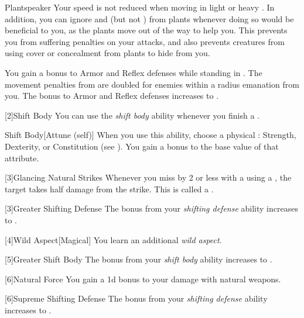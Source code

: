 {            \begin{freeability}{Plantspeaker}
                Your speed is not reduced when moving in light or heavy .
                In addition, you can ignore  and  (but not ) from plants whenever doing so would be beneficial to you, as the plants move out of the way to help you.
                This prevents you from suffering penalties on your attacks, and also prevents creatures from using cover or concealment from plants to hide from you.

                \rankline
                 You gain a  bonus to Armor and Reflex defenses while standing in .
                 The movement penalties from  are doubled for enemies within a \areahuge radius emanation from you.
                 The bonus to Armor and Reflex defenses increases to .
            \end{freeability}
        }

        [2]{Shift Body} You can use the \textit{shift body} ability whenever you finish a .
        \begin{freeability}{Shift Body}[Attune (self)]
            When you use this ability, choose a physical : Strength, Dexterity, or Constitution (see ).
            You gain a  bonus to the base value of that attribute.
        \end{freeability}

        [3]{Glancing Natural Strikes} Whenever you miss by 2 or less with a  using a , the target takes half damage from the strike.
        This is called a .

        [3]{Greater Shifting Defense}
        The bonus from your \textit{shifting defense} ability increases to .

        [4]{Wild Aspect}[Magical]
        You learn an additional \textit{wild aspect}.

        [5]{Greater Shift Body} The bonus from your \textit{shift body} ability increases to .

        [6]{Natural Force} You gain a \plus1d bonus to your damage with natural weapons.

        [6]{Supreme Shifting Defense}
        The bonus from your \textit{shifting defense} ability increases to .

